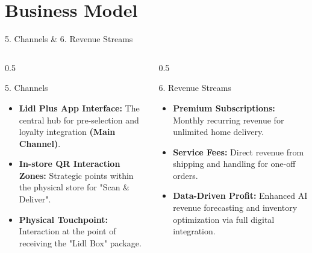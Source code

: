 \documentclass[aspectratio=169]{beamer}
\begin{document}
\section{Business Model}
\begin{frame}{5. Channels \& 6. Revenue Streams}
    \begin{columns}[t]
        \begin{column}{0.5\textwidth}
            \begin{block}{5. Channels}
                \begin{itemize}
                    \item \textbf{Lidl Plus App Interface:} The central hub for pre-selection and loyalty integration \textbf{(Main Channel)}.
                    \item \textbf{In-store QR Interaction Zones:} Strategic points within the physical store for "Scan \& Deliver".
                    \item \textbf{Physical Touchpoint:} Interaction at the point of receiving the "Lidl Box" package.
                \end{itemize}
            \end{block}
        \end{column}
        \begin{column}{0.5\textwidth}
            \begin{block}{6. Revenue Streams}
                \begin{itemize}
                    \item \textbf{Premium Subscriptions:} Monthly recurring revenue for unlimited home delivery.
                    \item \textbf{Service Fees:} Direct revenue from shipping and handling for one-off orders.
                    \item \textbf{Data-Driven Profit:} Enhanced AI revenue forecasting and inventory optimization via full digital integration.
                \end{itemize}
            \end{block}
        \end{column}
    \end{columns}
\end{frame}

\end{document}
